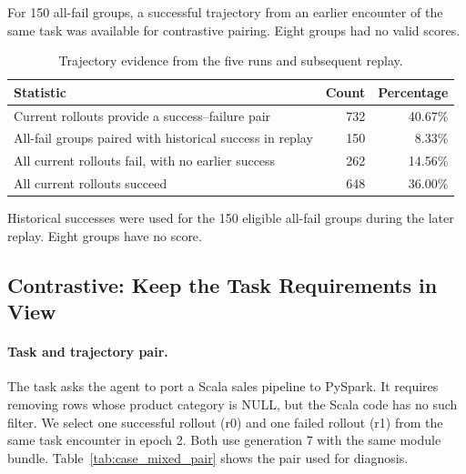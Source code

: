 \documentclass{article} %
\begin{document}

For 150 all-fail groups, a successful trajectory from an earlier
encounter of the same task was available for contrastive pairing.
Eight groups had no valid scores.


\begin{table}[t]
\centering
\small
\caption{Trajectory evidence from the five runs and subsequent replay.}
\begin{tabular}{lrr}
\toprule
\textbf{Statistic} & \textbf{Count} & \textbf{Percentage} \\
\midrule
Current rollouts provide a success--failure pair & 732 & 40.67\% \\
All-fail groups paired with historical success in replay & 150 & 8.33\% \\
All current rollouts fail, with no earlier success & 262 & 14.56\% \\
All current rollouts succeed & 648 & 36.00\% \\
\bottomrule
\end{tabular}
\label{tab:contrastive_coverage}
\end{table}

Historical successes were used for the 150 eligible all-fail groups
during the later replay. Eight groups have no score.


\subsection{Contrastive: Keep the Task Requirements in View}

\paragraph{Task and trajectory pair.}
The task asks the agent to port a Scala sales pipeline to PySpark.
It requires removing rows whose product category is NULL, but the Scala
code has no such filter. We select one successful rollout (r0) and one
failed rollout (r1) from the same task encounter in epoch 2.
Both use generation 7 with the same module bundle.
Table~\ref{tab:case_mixed_pair} shows the pair used for diagnosis.
\end{document}
